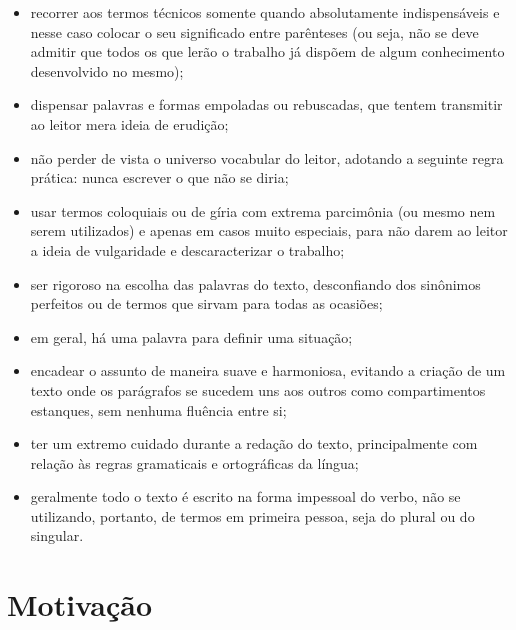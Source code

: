 \begin{itemize}
		\item recorrer aos termos técnicos somente quando absolutamente indispensáveis e nesse caso colocar o seu significado entre parênteses (ou seja, não se deve admitir que todos os que lerão o trabalho já dispõem de algum conhecimento desenvolvido no mesmo);
		
		\item dispensar palavras e formas empoladas ou rebuscadas, que tentem
transmitir ao leitor mera ideia de erudição;

		\item não perder de vista o universo vocabular do leitor, adotando a seguinte
regra prática: nunca escrever o que não se diria;

		\item usar termos coloquiais ou de gíria com extrema parcimônia (ou mesmo
nem serem utilizados) e apenas em casos muito especiais, para não darem ao leitor a ideia de vulgaridade e descaracterizar o trabalho;

		\item ser rigoroso na escolha das palavras do texto, desconfiando dos
sinônimos perfeitos ou de termos que sirvam para todas as ocasiões;

		\item em geral, há uma palavra para definir uma situação;

		\item encadear o assunto de maneira suave e harmoniosa, evitando a
criação de um texto onde os parágrafos se sucedem uns aos outros
como compartimentos estanques, sem nenhuma fluência entre si;

		\item ter um extremo cuidado durante a redação do texto, principalmente
com relação às regras gramaticais e ortográficas da língua;

		\item geralmente todo o texto é escrito na forma impessoal do verbo, não se utilizando,
portanto, de termos em primeira pessoa, seja do plural ou do singular.

	\end{itemize}
	

\section{Motivação}

